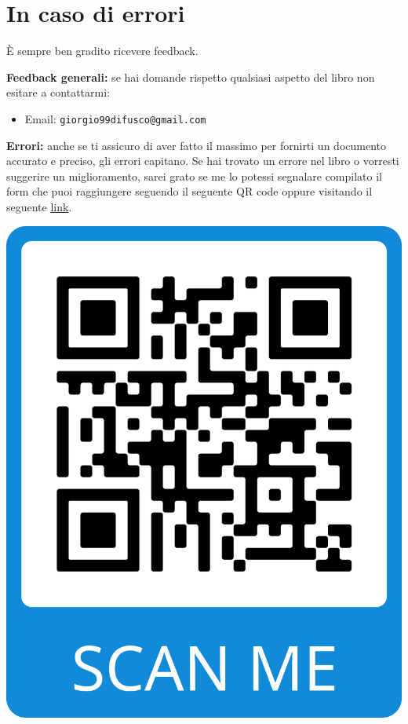 \section{In caso di errori}
È sempre ben gradito ricevere feedback.

\textbf{Feedback generali:} se hai domande rispetto qualsiasi aspetto del libro non esitare a contattarmi: 
\begin{itemize}
	\item Email: \texttt{giorgio99difusco@gmail.com} 
\end{itemize}

\textbf{Errori:} anche se ti assicuro di aver fatto il massimo per fornirti un documento accurato e preciso, gli errori capitano. Se hai trovato un errore nel libro o vorresti suggerire un miglioramento, sarei grato se me lo potessi segnalare compilato il form che puoi raggiungere seguendo il seguente QR code oppure visitando il seguente \href{https://docs.google.com/spreadsheets/d/1pE-LFclMiIKvmm-tN60bY82P5vNwiK-qvNsq407FNAc/edit?usp=sharing}{link}.

\begin{center}
	\includegraphics[scale=0.075]{res/Segnalazione_Errori}
\end{center}